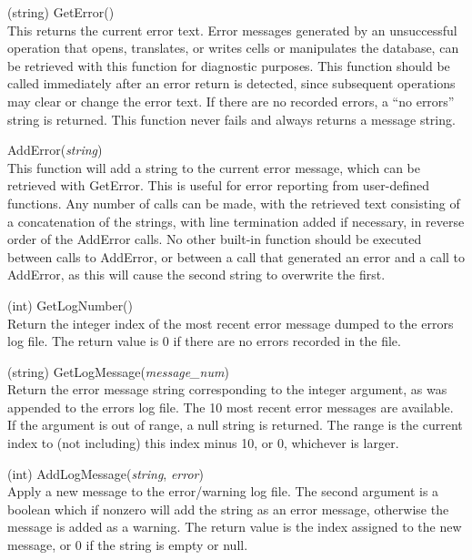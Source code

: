 \begin{description}
\item{(string) \vt GetError()}\\
This returns the current error text.  Error messages generated by an
unsuccessful operation that opens, translates, or writes cells or
manipulates the database, can be retrieved with this function for
diagnostic purposes.  This function should be called immediately after
an error return is detected, since subsequent operations may clear or
change the error text.  If there are no recorded errors, a ``no
errors'' string is returned.  This function never fails and always
returns a message string.

\item{\vt AddError({\it string\/})}\\
This function will add a string to the current error message, which
can be retrieved with {\vt GetError}.  This is useful for error
reporting from user-defined functions.  Any number of calls can be
made, with the retrieved text consisting of a concatenation of the
strings, with line termination added if necessary, in reverse order of
the {\vt AddError} calls.  No other built-in function should be
executed between calls to {\vt AddError}, or between a call that
generated an error and a call to {\vt AddError}, as this will cause
the second string to overwrite the first.

\item{(int) \vt GetLogNumber()}\\
Return the integer index of the most recent error message dumped to
the errors log file.  The return value is 0 if there are no errors
recorded in the file.

\item{(string) \vt GetLogMessage({\it message\_num\/})}\\
Return the error message string corresponding to the integer argument,
as was appended to the errors log file.  The 10 most recent error
messages are available.  If the argument is out of range, a null
string is returned.  The range is the current index to (not including)
this index minus 10, or 0, whichever is larger.

\item{(int) \vt AddLogMessage({\it string}, {\it error\/})}\\
Apply a new message to the error/warning log file.  The second
argument is a boolean which if nonzero will add the string as an error
message, otherwise the message is added as a warning.  The return
value is the index assigned to the new message, or 0 if the string is
empty or null.
\end{description}


